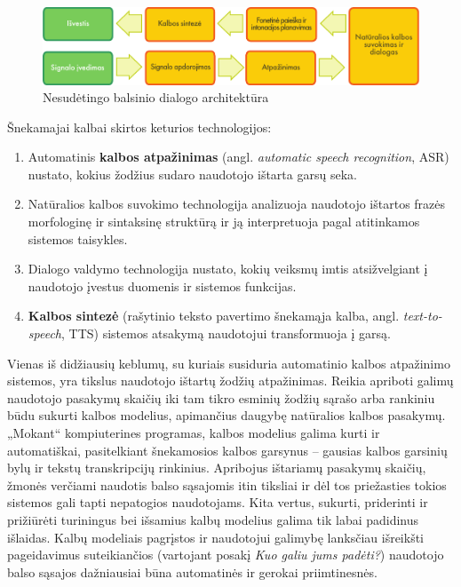 \begin{multicols}{2}
\begin{figure}[htb]
  \center 
  \includegraphics[width=\textwidth]{../_media/lithuanian/simple_speech-based_dialogue_architecture}
  \caption{Nesudėtingo balsinio dialogo architektūra}
  \label{fig:dialoguearch_de}
\end{figure}

Šnekamajai kalbai skirtos keturios technologijos:

\begin{enumerate}
\item Automatinis \textbf{kalbos atpažinimas} (angl. \textit{automatic speech recognition}, ASR) nustato, kokius žodžius sudaro naudotojo ištarta garsų seka.
\item Natūralios kalbos suvokimo technologija analizuoja naudotojo ištartos frazės morfologinę ir sintaksinę struktūrą ir ją interpretuoja pagal atitinkamos sistemos taisykles.
\item  Dialogo valdymo technologija nustato, kokių veiksmų imtis atsižvelgiant į naudotojo įvestus duomenis ir sistemos funkcijas.    
\item \textbf{Kalbos sintezė} (rašytinio teksto pavertimo šnekamąja kalba, angl. \textit{text-to-speech}, TTS) sistemos atsakymą naudotojui transformuoja į garsą.
\end{enumerate}

Vienas iš didžiausių keblumų, su kuriais susiduria automatinio kalbos atpažinimo sistemos, yra tikslus naudotojo ištartų žodžių atpažinimas. Reikia apriboti galimų naudotojo pasakymų skaičių iki tam tikro esminių žodžių sąrašo arba rankiniu būdu sukurti kalbos modelius, apimančius daugybę natūralios kalbos pasakymų. „Mokant“   kompiuterines programas, kalbos modelius galima kurti ir automatiškai, pasitelkiant šnekamosios kalbos garsynus – gausias kalbos garsinių bylų ir tekstų transkripcijų rinkinius. Apribojus ištariamų pasakymų skaičių, žmonės verčiami naudotis balso sąsajomis itin tiksliai ir dėl tos priežasties tokios sistemos gali tapti nepatogios naudotojams. Kita vertus, sukurti, priderinti ir prižiūrėti turiningus bei išsamius kalbų modelius galima tik labai padidinus išlaidas. Kalbų modeliais pagrįstos ir naudotojui galimybę lanksčiau išreikšti pageidavimus suteikiančios (vartojant posakį \textit{Kuo galiu jums padėti?}) naudotojo balso sąsajos dažniausiai būna automatinės ir gerokai priimtinesnės. 


\end{multicols}
